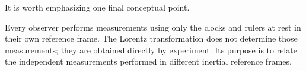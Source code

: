 \documentclass[12pt]{article}
\begin{document}
It is worth emphasizing one final conceptual point. \par

Every observer performs measurements using only the clocks and rulers at rest
in their own reference frame. The Lorentz transformation does not determine
those measurements; they are obtained directly by experiment. Its purpose is to
relate the independent measurements performed in different inertial reference
frames. \par
\end{document}
